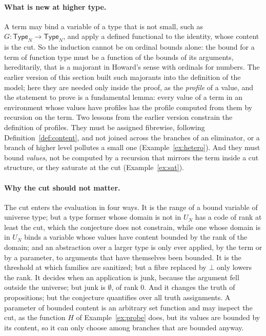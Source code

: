 \documentclass[10pt]{article}
\newcommand{\Type}{\mathsf{Type}}
\begin{document}
\paragraph{What is new at higher type.}
A term may bind a variable of a type that is not small, such as
$G:\Type_N\to\Type_N$, and apply a defined functional to the identity,
whose content is the cut. So the induction cannot be on ordinal bounds
alone: the bound for a term of function type must be a function of the
bounds of its arguments, hereditarily, that is a majorant in Howard's
sense with ordinals for numbers. The earlier version of this section
built such majorants into the definition of the model; here they are
needed only inside the proof, as the \emph{profile} of a value, and the
statement to prove is a fundamental lemma: every value of a term in an
environment whose values have profiles has the profile computed from
them by recursion on the term. Two lessons from the earlier version
constrain the definition of profiles. They must be assigned fibrewise,
following Definition~\ref{def:content}, and not joined across the
branches of an eliminator, or a branch of higher level pollutes a small
one (Example~\ref{ex:hetero}). And they must bound \emph{values}, not be
computed by a recursion that mirrors the term inside a cut structure,
or they saturate at the cut (Example~\ref{ex:sat}).

\paragraph{Why the cut should not matter.}
The cut enters the evaluation in four ways. It is the range of a bound
variable of universe type; but a type former whose domain is not in
$U_N$ has a code of rank at least the cut, which the conjecture does
not constrain, while one whose domain is in $U_N$ binds a variable whose
values have content bounded by the rank of the domain; and an
abstraction over a larger type is only ever applied, by the term or by
a parameter, to arguments that have themselves been bounded. It is the
threshold at which families are sanitized; but a fibre replaced by
$\bot$ only lowers the rank. It decides when an application is junk,
because the argument fell outside the universe; but junk is $\emptyset$,
of rank $0$. And it changes the truth of propositions; but the
conjecture quantifies over all truth assignments. A parameter of
bounded content is an arbitrary set function and may inspect the cut,
as the function $H$ of Example~\ref{ex:probe} does, but its values are
bounded by its content, so it can only choose among branches that are
bounded anyway.
\end{document}
